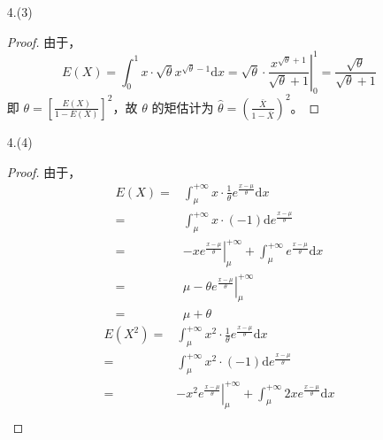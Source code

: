 \documentclass[normal,cn]{elegantnote}
\begin{document}
\begin{enumerate}
    \item[4.(3)]
        \begin{proof}
            由于，
            \begin{equation*}
                E(X)=\int_{0}^{1}x\cdot\sqrt{\theta}x^{\sqrt{\theta}-1}\mathrm{d}x=\left.\sqrt{\theta}\cdot\frac{x^{\sqrt{\theta}+1}}{\sqrt{\theta}+1}\right|_{0} ^{1}=\frac{\sqrt{\theta}}{\sqrt{\theta}+1}
            \end{equation*}
            即 $\theta=\left[\frac{E(X)}{1-E(X)}\right]^{2}$，故 $\theta$ 的矩估计为 $\hat{\theta}=\left(\frac{\bar{X}}{1-\bar{X}}\right)^{2}$。

        \end{proof}

    \item[4.(4)]
        \begin{proof}
            由于，
            \begin{equation*}
                \begin{aligned}
                    E(X)= & \int_{\mu}^{+\infty}x\cdot\frac{1}{\theta}e^{\frac{x-\mu}{\theta}}\mathrm{d}x                                   \\
                    =     & \int_{\mu}^{+\infty}x\cdot(-1)\mathrm{d}e^{\frac{x-\mu}{\theta}}                                                \\
                    =     & -\left.xe^{\frac{x-\mu}{\theta}}\right|_{\mu}^{+\infty}+\int_{\mu}^{+\infty}e^{\frac{x-\mu}{\theta}}\mathrm{d}x \\
                    =     & \mu-\left.\theta e^{\frac{x-\mu}{\theta}}\right|_{\mu}^{+\infty}                                                \\
                    =     & \mu+\theta
                \end{aligned}
            \end{equation*}
            \begin{equation*}
                \begin{aligned}
                    E\left(X^{2}\right)  = & \int_{\mu}^{+\infty}x^{2}\cdot\frac{1}{\theta}e^{\frac{x-\mu}{\theta}}\mathrm{d}x                                     \\
                    =                      & \int_{\mu}^{+\infty}x^{2}\cdot(-1)\mathrm{d}e^{\frac{x-\mu}{\theta}}                                                  \\
                    =                      & -\left.x^{2}e^{\frac{x-\mu}{\theta}}\right|_{\mu}^{+\infty}+\int_{\mu}^{+\infty}2xe^{\frac{x-\mu}{\theta}}\mathrm{d}x \\

\end{aligned}
\end{equation*}
\end{proof}
\end{enumerate}
\end{document}
